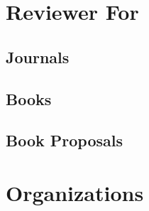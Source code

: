 \section*{Reviewer For}

\subsection*{Journals}

\begin{itemize}
\end{itemize}

\subsection*{Books}

\begin{itemize}
\end{itemize}

\subsection*{Book Proposals}

\begin{itemize}
\end{itemize}

\section*{Organizations}

\begin{itemize}
\end{itemize}

